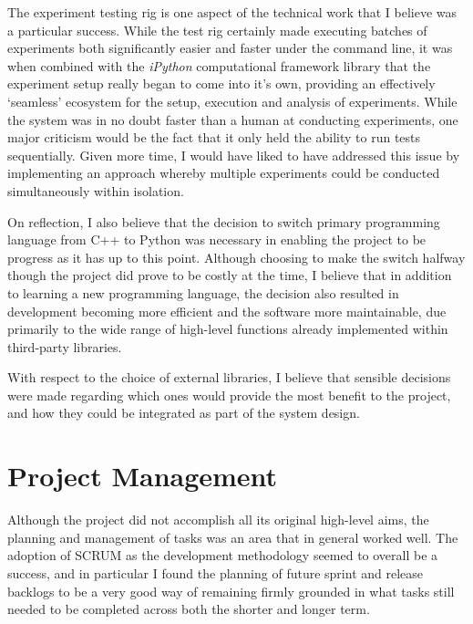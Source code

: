 The experiment testing rig is one aspect of the technical work that I believe was a particular success. While the test rig certainly made executing batches of experiments both significantly easier and faster under the command line, it was when combined with the \textit{iPython} computational framework library that the experiment setup really began to come into it's own, providing an effectively `seamless' ecosystem for the setup, execution and analysis of experiments. While the system was in no doubt faster than a human at conducting experiments, one major criticism would be the fact that it only held the ability to run tests sequentially. Given more time, I would have liked to have addressed this issue by implementing an approach whereby multiple experiments could be conducted simultaneously within isolation. 

On reflection, I also believe that the decision to switch primary programming language from C++ to Python was necessary in enabling the project to be progress as it has up to this point. Although choosing to make the switch halfway though the project did prove to be costly at the time, I believe that in addition to learning a new programming language, the decision also resulted in development becoming more efficient and the software more maintainable, due primarily to the wide range of high-level functions already implemented within third-party libraries. 

With respect to the choice of external libraries, I believe that sensible decisions were made regarding which ones would provide the most benefit to the project, and how they could be integrated as part of the system design. 

%

\section{Project Management}

Although the project did not accomplish all its original high-level aims, the planning and management of tasks was an area that in general worked well. The adoption of SCRUM as the development methodology seemed to overall be a success, and in particular I found the planning of future sprint and release backlogs to be a very good way of remaining firmly grounded in what tasks still needed to be completed across both the shorter and longer term.  

